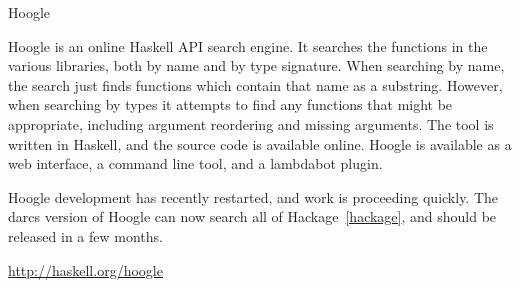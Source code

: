 \begin{hcarentry}[updated]{Hoogle}
\label{Hoogle}
\makeheader

Hoogle is an online Haskell API search engine. It searches the functions in the various libraries,
both by name and by type signature. When searching by name, the search just finds functions which
contain that name as a substring. However, when searching by types it attempts to find any functions
that might be appropriate, including argument reordering and missing arguments. The tool is written
in Haskell, and the source code is available online. Hoogle is available as a web interface, a
command line tool, and a lambdabot plugin.

Hoogle development has recently restarted, and work is proceeding quickly. The darcs version of
Hoogle can now search all of Hackage~\cref{hackage}, and should be released in a few months.

\FurtherReading
\url{http://haskell.org/hoogle}
\end{hcarentry}
